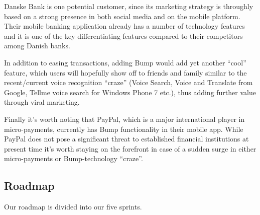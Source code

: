 \documentclass[a4paper,11pt]{article}
\begin{document}
Danske Bank is one potential customer, since its marketing strategy is throughly based on a strong presence in both social media and on the mobile platform. Their mobile banking application already has a number of technology features and it is one of the key differentiating features compared to their competitors among Danish banks.

In addition to easing transactions, adding Bump would add yet another ``cool'' feature, which users will hopefully show off to friends and family similar to the recent/current voice recognition ``craze'' (Voice Search, Voice and Translate from Google, Tellme voice search for Windows Phone 7 etc.), thus adding further value through viral marketing.

Finally it's worth noting that PayPal, which is a major international player in micro-payments, currently has Bump functionality in their mobile app. While PayPal does not pose a significant threat to established financial institutions at present time it's worth staying on the forefront in case of a sudden surge in either micro-payments or Bump-technology ``craze''.

\subsection{Roadmap} %
\label{subsec:roadmap}
Our roadmap is divided into our five sprints.
\end{document}
